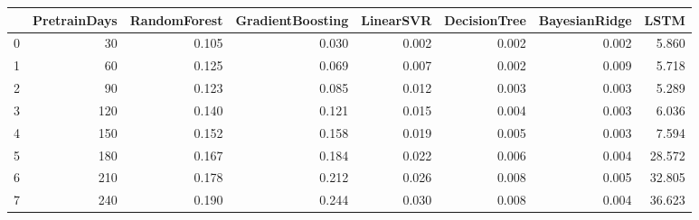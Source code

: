 \begin{tabular}{lrrrrrrr}
\toprule
{} &  PretrainDays &  RandomForest &  GradientBoosting &  LinearSVR &  DecisionTree &  BayesianRidge &   LSTM \\
\midrule
0 &            30 &         0.105 &             0.030 &      0.002 &         0.002 &          0.002 &  5.860 \\
1 &            60 &         0.125 &             0.069 &      0.007 &         0.002 &          0.009 &  5.718 \\
2 &            90 &         0.123 &             0.085 &      0.012 &         0.003 &          0.003 &  5.289 \\
3 &           120 &         0.140 &             0.121 &      0.015 &         0.004 &          0.003 &  6.036 \\
4 &           150 &         0.152 &             0.158 &      0.019 &         0.005 &          0.003 &  7.594 \\
5 &           180 &         0.167 &             0.184 &      0.022 &         0.006 &          0.004 & 28.572 \\
6 &           210 &         0.178 &             0.212 &      0.026 &         0.008 &          0.005 & 32.805 \\
7 &           240 &         0.190 &             0.244 &      0.030 &         0.008 &          0.004 & 36.623 \\
\bottomrule
\end{tabular}

